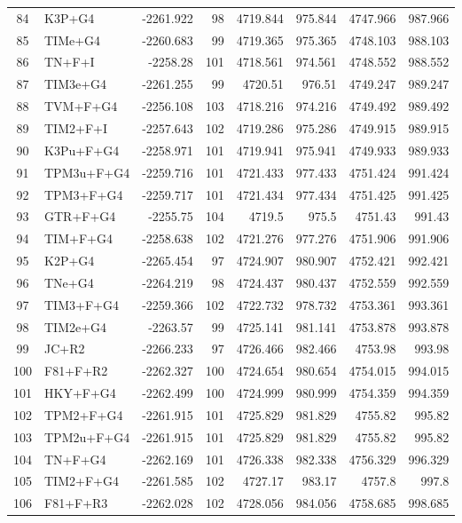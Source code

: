 \begin{longtable}{clrrrrrr}
	84 & K3P+G4 & -2261.922 & 98 & 4719.844 & 975.844 & 4747.966 & 987.966 \\ 
	85 & TIMe+G4 & -2260.683 & 99 & 4719.365 & 975.365 & 4748.103 & 988.103 \\ 
	86 & TN+F+I & -2258.28 & 101 & 4718.561 & 974.561 & 4748.552 & 988.552 \\ 
	87 & TIM3e+G4 & -2261.255 & 99 & 4720.51 & 976.51 & 4749.247 & 989.247 \\ 
	88 & TVM+F+G4 & -2256.108 & 103 & 4718.216 & 974.216 & 4749.492 & 989.492 \\ 
	89 & TIM2+F+I & -2257.643 & 102 & 4719.286 & 975.286 & 4749.915 & 989.915 \\ 
	90 & K3Pu+F+G4 & -2258.971 & 101 & 4719.941 & 975.941 & 4749.933 & 989.933 \\ 
	91 & TPM3u+F+G4 & -2259.716 & 101 & 4721.433 & 977.433 & 4751.424 & 991.424 \\ 
	92 & TPM3+F+G4 & -2259.717 & 101 & 4721.434 & 977.434 & 4751.425 & 991.425 \\ 
	93 & GTR+F+G4 & -2255.75 & 104 & 4719.5 & 975.5 & 4751.43 & 991.43 \\ 
	94 & TIM+F+G4 & -2258.638 & 102 & 4721.276 & 977.276 & 4751.906 & 991.906 \\ 
	95 & K2P+G4 & -2265.454 & 97 & 4724.907 & 980.907 & 4752.421 & 992.421 \\ 
	96 & TNe+G4 & -2264.219 & 98 & 4724.437 & 980.437 & 4752.559 & 992.559 \\ 
	97 & TIM3+F+G4 & -2259.366 & 102 & 4722.732 & 978.732 & 4753.361 & 993.361 \\ 
	98 & TIM2e+G4 & -2263.57 & 99 & 4725.141 & 981.141 & 4753.878 & 993.878 \\ 
	99 & JC+R2 & -2266.233 & 97 & 4726.466 & 982.466 & 4753.98 & 993.98 \\ 
	100 & F81+F+R2 & -2262.327 & 100 & 4724.654 & 980.654 & 4754.015 & 994.015 \\ 
	101 & HKY+F+G4 & -2262.499 & 100 & 4724.999 & 980.999 & 4754.359 & 994.359 \\ 
	102 & TPM2+F+G4 & -2261.915 & 101 & 4725.829 & 981.829 & 4755.82 & 995.82 \\ 
	103 & TPM2u+F+G4 & -2261.915 & 101 & 4725.829 & 981.829 & 4755.82 & 995.82 \\ 
	104 & TN+F+G4 & -2262.169 & 101 & 4726.338 & 982.338 & 4756.329 & 996.329 \\ 
	105 & TIM2+F+G4 & -2261.585 & 102 & 4727.17 & 983.17 & 4757.8 & 997.8 \\ 
	106 & F81+F+R3 & -2262.028 & 102 & 4728.056 & 984.056 & 4758.685 & 998.685 \\ 

\end{longtable}

